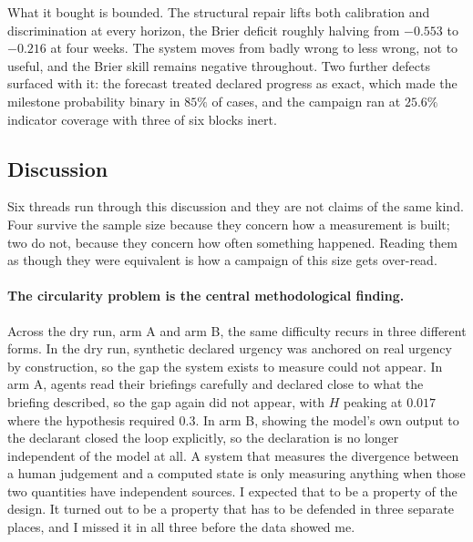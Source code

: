What it bought is bounded. The structural repair lifts both calibration and discrimination at
every horizon, the Brier deficit roughly halving from $-0.553$ to $-0.216$ at four weeks. The
system moves from badly wrong to less wrong, not to useful, and the Brier skill remains
negative throughout. Two further defects surfaced with it: the forecast treated declared
progress as exact, which made the milestone probability binary in $85\%$ of cases, and the
campaign ran at $25.6\%$ indicator coverage with three of six blocks inert.

\subsection{Discussion}
\label{sec:res_discussion}

Six threads run through this discussion and they are not claims of the same kind. Four
survive the sample size because they concern how a measurement is built; two do not,
because they concern how often something happened. Reading them as though they were
equivalent is how a campaign of this size gets over-read.

\paragraph{The circularity problem is the central methodological finding.}
Across the dry run, arm A and arm B, the same difficulty recurs in three different forms.
In the dry run, synthetic declared urgency was anchored on real urgency by construction, so
the gap the system exists to measure could not appear. In arm A, agents read their briefings
carefully and declared close to what the briefing described, so the gap again did not
appear, with $H$ peaking at $0.017$ where the hypothesis required $0.3$. In arm B, showing
the model's own output to the declarant closed the loop explicitly, so the declaration is
no longer independent of the model at all. A system that measures the divergence between a
human judgement and a computed state is only measuring anything when those two quantities
have independent sources. I expected that to be a property of the design. It turned out to
be a property that has to be defended in three separate places, and I missed it in all
three before the data showed me.

